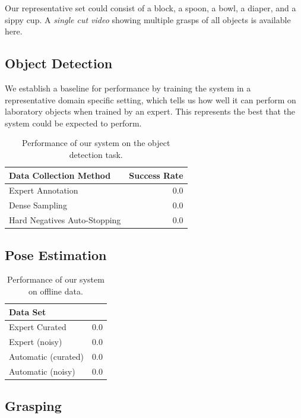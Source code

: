 \documentclass[conference]{IEEEtran}
\begin{document}
Our representative set could consist of a block, a spoon,
a bowl, a diaper, and a sippy cup. A \emph{single cut video} showing multiple grasps
of all objects is available here.

\subsection{Object Detection}
We establish a baseline for performance by training the system in a representative domain
specific setting, which tells us how well it can perform on laboratory objects when trained by an 
expert. This represents the best that the system could be expected to perform.

\begin{table}
  \begin{center}
  \caption{Performance of our system on the object detection task.}
  \begin{tabular}{lr}
    \toprule
  Data Collection Method & Success Rate \\ 
  \midrule
  Expert Annotation & 0.0 \\ 
  Dense Sampling & 0.0 \\ 
  Hard Negatives Auto-Stopping & 0.0 \\ 
  \bottomrule
  \end{tabular}
  \end{center}
\end{table}

\subsection{Pose Estimation}

\begin{table}
  \caption{Performance of our system on offline data.}
  \begin{center}
  \begin{tabular}{lr}
\toprule
  Data Set            &  \\ 
\midrule
  Expert Curated      & 0.0 \\ 
  Expert (noisy)      & 0.0 \\ 
  Automatic (curated) & 0.0 \\ 
  Automatic (noisy)   & 0.0\\
\bottomrule
  \end{tabular}

  \end{center}
\end{table}


\subsection{Grasping}
\end{document}
